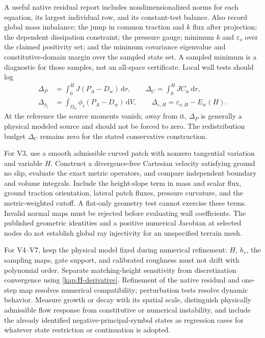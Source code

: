 \documentclass[11pt,a4paper]{article}
\numberwithin{equation}{section}
\newcommand{\eps}{\varepsilon}
\newcommand{\dd}{\mathrm d}
\begin{document}
A useful native residual report includes nondimensionalized norms
for each equation, its largest individual row, and its constant-test
balance.  Also record global mass imbalance; the jump in common
traction and $k$ flux after projection; the dependent dissipation
constraint; the pressure gauge; minimum $k$ and $\eps_o$ over the
claimed positivity set; and the minimum covariance eigenvalue and
constitutive-domain margin over the sampled state set.  A sampled
minimum is a diagnostic for those samples, not an all-space
certificate.  Local wall tests should log
\begin{equation}
 \begin{aligned}
 \Delta_P&=\int_0^HJ(P_A-D_w)\,\dd r,\qquad
 \Delta_C=\int_0^HJC_w\,\dd r,\\
 \Delta_{\phi_i}&=\int_{\Omega_w}\phi_i(P_A-D_w)\,\dd V,
 \qquad
 \Delta_{\eps,H}=\eps_{o,H}-E_w(H).
 \end{aligned}
 \label{num:diagnostic-balances}
\end{equation}
At the reference the source moments vanish; away from it,
$\Delta_P$ is generally a physical modeled source and should not
be forced to zero.  The redistribution budget $\Delta_C$ remains
zero for the stated conservative construction.

For V3, use a smooth admissible curved patch with nonzero tangential
variation and variable $H$.  Construct a divergence-free Cartesian
velocity satisfying ground no slip, evaluate the exact metric
operators, and compare independent boundary and volume integrals.
Include the height-slope term in mass and scalar flux, ground
traction orientation, lateral patch fluxes, pressure curvature,
and the metric-weighted cutoff.  A flat-only geometry test cannot
exercise these terms.  Invalid normal maps must be rejected before
evaluating wall coefficients.  The published geometric identities
and a positive numerical Jacobian at selected nodes do not establish
global ray injectivity for an unspecified terrain mesh.

For V4--V7, keep the physical model fixed during numerical
refinement: $H$, $h_r$, the sampling maps, gate support, and calibrated
roughness must not drift with polynomial order.  Separate
matching-height sensitivity from discretization convergence using
\cref{kap:H-derivative}.  Refinement of the native residual and
one-step map resolves numerical compatibility; perturbation tests
resolve dynamic behavior.  Measure growth or decay with its spatial
scale, distinguish physically admissible flow response from
constitutive or numerical instability, and include the already
identified negative-principal-symbol states as regression cases
for whatever state restriction or continuation is adopted.
\end{document}
